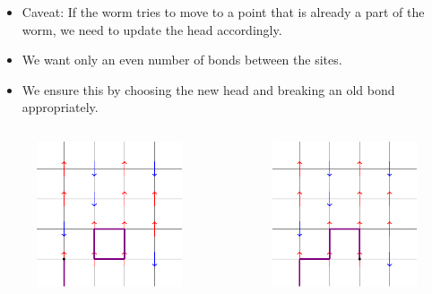 \documentclass{beamer}
\begin{document}
\begin{frame}
\begin{itemize}
    \item Caveat: If the worm tries to move to a point that is already a part of the worm, we need to update the head accordingly.
    \item We want only an even number of bonds between the sites.
    \item We ensure this by choosing the new head and breaking an old bond appropriately.
\end{itemize}
\begin{columns}
\begin{column}{0.5\textwidth}
\begin{figure}
    \centering
    \includegraphics{tikz5.pdf}
\end{figure}
\end{column}
\begin{column}{0.5\textwidth}
\begin{figure}
    \centering
    \includegraphics{tikz6.pdf}
\end{figure}
\end{column}
\end{columns}
\end{frame}
\end{document}
